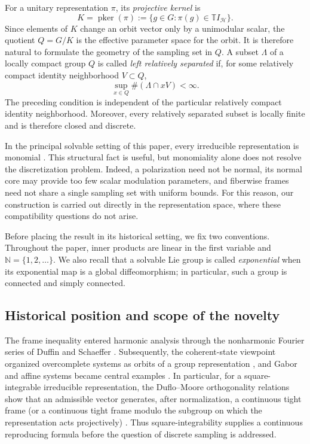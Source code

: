 \documentclass[10pt,a4paper]{amsart}
\numberwithin{equation}{section}
\newcommand{\cH}{\mathcal H}
\newcommand{\N}{\mathbb N}
\newcommand{\T}{\mathbb T}
\newcommand{\pker}{\operatorname{pker}}
\begin{document}
For a unitary representation $\pi$, its \emph{projective kernel} is
\begin{equation}\label{eq:projective-kernel}
 K=\pker(\pi)
   :=\{g\in G:\pi(g)\in\T I_{\cH}\}.
\end{equation}
Since elements of $K$ change an orbit vector only by a unimodular scalar, the
quotient $Q=G/K$ is the effective parameter space for the orbit.  It is
therefore natural to formulate the geometry of the sampling set in $Q$.  A
subset $\Lambda$ of a locally compact group $Q$ is called \emph{left
relatively separated} if, for some relatively
compact identity neighborhood $V\subset Q$,
\begin{equation}\label{eq:relative-separation}
  \sup_{x\in Q}\#(\Lambda\cap xV)<\infty.
\end{equation}
The preceding condition is independent of the particular relatively compact
identity neighborhood.  Moreover, every relatively separated subset is
locally finite and is therefore closed and discrete.

In the principal solvable setting of this paper, every irreducible
representation is monomial \cite{Pukanszky1968,LeptinLudwig1994}.  This
structural fact is useful, but monomiality alone does not resolve the
discretization problem.  Indeed, a polarization need not be normal, its
normal core may provide too few scalar modulation parameters, and fiberwise
frames need not share a single sampling set with uniform bounds.  For this
reason, our construction is carried out directly in the representation
space, where these compatibility questions do not arise.

Before placing the result in its historical setting, we fix two conventions.
Throughout the paper, inner products are linear in the first variable and
$\N=\{1,2,\ldots\}$.  We also recall that a solvable Lie group is called
\emph{exponential} when its exponential map is a global diffeomorphism; in
particular, such a group is connected and simply connected.

\subsection{Historical position and scope of the novelty}
\label{subsec:history-novelty}

The frame inequality entered harmonic analysis through the nonharmonic
Fourier series of Duffin and Schaeffer \cite{DuffinSchaeffer1952}.
Subsequently, the coherent-state viewpoint organized overcomplete systems as
orbits of a group representation \cite{Perelomov1972}, and Gabor and affine
systems became central examples \cite{DaubechiesGrossmannMeyer1986}.  In
particular, for a square-integrable
irreducible representation, the Duflo--Moore orthogonality relations show that
an admissible vector generates, after normalization, a continuous tight frame
(or a continuous tight frame modulo the subgroup on which the representation
acts projectively) \cite{DufloMoore1976}.  Thus square-integrability supplies
a continuous reproducing formula before the question of discrete sampling is
addressed.
\end{document}
